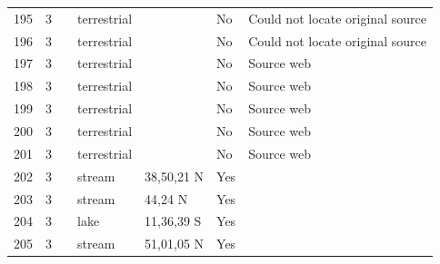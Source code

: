 \documentclass[12pt]{article}
\begin{document}
\begin{landscape}
\begin{table}[h!]
{\begin{tabular}{p{2.8cm}p{1.3cm}p{5.5cm}p{2.2cm}p{2.5cm}lp{3.5cm}}
        195   & 3 & \cite{Schoenly1983a}    & terrestrial &       & No    & Could not locate original source \\
        196   & 3 & \cite{Schoenly1983a}    & terrestrial &       & No    & Could not locate original source \\
        197   & 3 & \cite{Mohr1943}    & terrestrial &       & No    & Source web \\
        198   & 3 & \cite{Schoenly1983}  & terrestrial &       & No    & Source web \\
        199   & 3 & \cite{Valiela1969}    & terrestrial &       & No    & Source web \\
        200   & 3 & \cite{Valiela1974}    & terrestrial &       & No    & Source web \\
        201   & 3 & \cite{Valiela1974}    & terrestrial &       & No    & Source web \\
        202   & 3 & \cite{Allan1982}    & stream & 38,50,21 N & Yes   &       \\
        203   & 3 & \cite{Collins1976}    & stream & 44,24 N & Yes   &       \\
        204   & 3 & \cite{Fryer1959} & lake  & 11,36,39 S & Yes   &       \\
        205   & 3 & \cite{Hildrew1985}     & stream & 51,01,05 N & Yes   &       \\
        \hline
      \end{tabular}}%
      \end{table}

        \newpage


\end{landscape}
\end{document}
